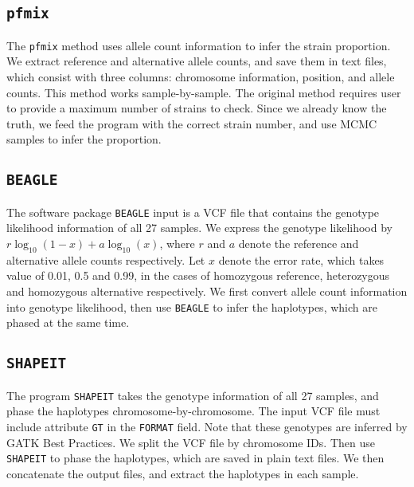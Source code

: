 \documentclass{article}
\begin{document}
\subsection{\texttt{pfmix}}
The \texttt{pfmix} method uses allele count information to infer the strain proportion. We extract reference and alternative allele counts, and save them in text files, which consist with three columns: chromosome information, position, and allele counts. This method works sample-by-sample. The original method requires user to provide a maximum number of strains to check. Since we already know the truth, we feed the program with the correct strain number, and use MCMC samples to infer the proportion.

\subsection{\texttt{BEAGLE}}
The software package \texttt{BEAGLE} input is a VCF file that contains the genotype likelihood information of all 27 samples. We express the genotype likelihood by $r \log_{10}(1-x) + a \log_{10}(x)$, where $r$ and $a$ denote the reference and alternative allele counts respectively. Let $x$ denote the error rate, which takes value of 0.01, 0.5 and 0.99, in the cases of homozygous reference, heterozygous and homozygous alternative respectively.
We first convert allele count information into genotype likelihood, then use \texttt{BEAGLE} to infer the haplotypes, which are phased at the same time.

\subsection{\texttt{SHAPEIT}}
The program \texttt{SHAPEIT} takes the genotype information of all 27 samples, and phase the haplotypes chromosome-by-chromosome. The input VCF file must include attribute \texttt{GT} in the \texttt{FORMAT} field. Note that these genotypes are inferred by GATK Best Practices. We split the VCF file by chromosome IDs. Then use \texttt{SHAPEIT} to phase the haplotypes, which are saved in plain text files. We then concatenate the output files, and extract the haplotypes in each sample.
\end{document}

